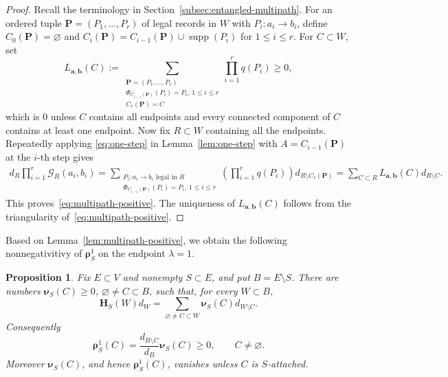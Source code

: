 \documentclass[11pt]{article}
\numberwithin{equation}{section}
\newcommand{\1}{\mathbf{1}}
\newtheorem{proposition}[theorem]{Proposition}
\newcommand{\supp}{\operatorname{supp}}
\newcommand{\Gc}{\mathcal G}
\newcommand{\bH}{\mathbf H}
\newcommand{\brho}{\boldsymbol{\rho}}
\newcommand{\bnu}{\boldsymbol{\nu}}
\begin{document}
\begin{proof}
Recall the terminology in Section~\ref{subsec:entangled-multipath}. For an ordered tuple
\(\mathbf P=(P_1,\ldots,P_r)\) of legal records in \(W\) with
\(P_i:a_i\to b_i\), define $C_0(\mathbf P)=\varnothing$ and $ C_i(\mathbf P)
 =C_{i-1}(\mathbf P)\cup\supp(P_i)$ for $1\le i\le r$.
For \(C\subset W\), set
\begin{equation}\label{eq:multipath-coefficient}
 L_{\mathbf a,\mathbf b}(C)
 :=
 \sum_{\substack{
 \mathbf P=(P_1,\ldots,P_r)\\
 \Phi_{C_{i-1}(\mathbf P)}(P_i)=P_i,\ 1\le i\le r\\
 C_r(\mathbf P)=C}}
 \prod_{i=1}^r q(P_i)\ge0,
\end{equation}
which is $0$ unless \(C\) contains all endpoints
and every connected component of \(C\) contains at least one endpoint.
Now fix \(R\subset W\) containing all the endpoints.  Repeatedly applying
\eqref{eq:one-step} in Lemma~\ref{lem:one-step} with \(A=C_{i-1}(\mathbf P)\) at the \(i\)-th step gives
\[
\begin{aligned}
 d_R\prod_{i=1}^r\Gc_R(a_i,b_i)
 =
 \sum_{\substack{
 P_i:a_i\to b_i\text{ legal in }R\\
 \Phi_{C_{i-1}(\mathbf P)}(P_i)=P_i,\ 1\le i\le r}}
 \left(\prod_{i=1}^r q(P_i)\right)
 d_{R\setminus C_r(\mathbf P)}  =
 \sum_{C\subset R}
 L_{\mathbf a,\mathbf b}(C)d_{R\setminus C}.
\end{aligned}
\]
This proves~\eqref{eq:multipath-positive}. The uniqueness of $L_{\mathbf a,\mathbf b}(C)$ follows from the triangularity of~\eqref{eq:multipath-positive}.
\end{proof}

Based on Lemma~\ref{lem:multipath-positive}, we obtain the following nonnegativitivy of $\brho_S^1$ on the endpoint $\lambda=1$.
\begin{proposition}\label{prop:endpoint-deconvolution}
Fix \(E\subset V\) and nonempty \(S\subset E\), and put
\(B=E\setminus S\).  There are numbers
\(\bnu_S(C)\ge0\), \(\varnothing\ne C\subset B\), such that, for every
\(W\subset B\),
\begin{equation}\label{eq:nu-expansion}
        \bH_S(W)d_W=
        \sum_{\varnothing\ne C\subset W}\bnu_S(C)d_{W\setminus C} .
\end{equation}
Consequently
\begin{equation}\label{eq:rho-one-positive}
        \brho_S^1(C)=\frac{d_{B\setminus C}}{d_B}\bnu_S(C)\ge0,
        \qquad C\ne\varnothing .
\end{equation}
Moreover \(\bnu_S(C)\), and hence \(\brho_S^1(C)\), vanishes unless \(C\) is
\(S\)-attached.
\end{proposition}
\end{document}
